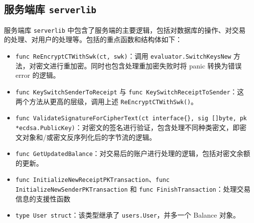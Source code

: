 \subsection{服务端库 \verb|serverlib|}

服务端库 \verb|serverlib| 中包含了服务端的主要逻辑，包括对数据库的操作、对交易的处理、对用户的处理等。包括的重点函数和结构体如下：

\begin{itemize}
    \item \verb|func ReEncryptCTWithSwk(ct, swk)|：调用 \verb|evaluator.SwitchKeysNew| 方法，对密文进行重加密。同时也包含处理重加密失败时将 panic 转换为错误 error 的逻辑。
    \item \verb|func KeySwitchSenderToReceipt| 与 \verb|func KeySwitchReceiptToSender|：这两个方法从更高的层级，调用上述 \verb|ReEncryptCTWithSwk()|。
    \item \verb|func ValidateSignatureForCipherText(ct interface{}, sig []byte, pk *ecdsa.PublicKey)|：对密文的签名进行验证，包含处理不同种类密文，即密文对象和/或密文反序列化后的字节流的逻辑。
    \item \verb|func GetUpdatedBalance|：对交易后的账户进行处理的逻辑，包括对密文余额的更新。
    \item \verb|func InitializeNewReceiptPKTransaction|、\verb|func InitializeNewSenderPKTransaction| 和 \verb|func FinishTransaction|：处理交易信息的支援性函数
    \item \verb|type User struct|：该类型继承了 \verb|users.User|，并多一个 Balance 对象。
\end{itemize}

